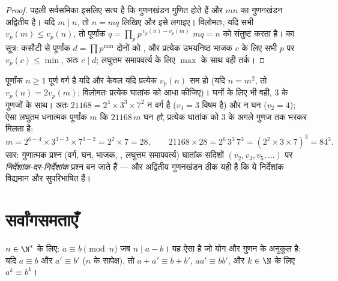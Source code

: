 \begin{proof}
पहली सर्वसमिका इसलिए सत्य है कि गुणनखंडन गुणित होते हैं और $mn$ का गुणनखंडन
अद्वितीय है। यदि $m \mid n$, तो $n = mq$ लिखिए और इसे लगाइए। विलोमतः, यदि
सभी $v_p(m) \leq v_p(n)$, तो पूर्णांक $q = \prod_p p^{\,v_p(n) - v_p(m)}$
$mq = n$ को संतुष्ट करता है।  का सूत्र: कसौटी से पूर्णांक $d
= \prod p^{\min}$ दोनों को , और प्रत्येक उभयनिष्ठ भाजक $c$ के
लिए सभी $p$ पर $v_p(c) \leq \min$, अतः $c \mid d$; लघुत्तम समापवर्त्य के लिए
$\max$ के साथ वही तर्क।
\end{proof}

\begin{example}[मूल्यांकनों से वर्ग और घन]\label{ex:b1:arith:squarecube}
पूर्णांक $n \geq 1$ पूर्ण वर्ग है यदि और केवल यदि प्रत्येक $v_p(n)$ सम हो
(यदि $n = m^2$, तो $v_p(n) = 2v_p(m)$; विलोमतः प्रत्येक घातांक को आधा
कीजिए)। घनों के लिए भी वही, $3$ के गुणजों के साथ। अतः $21168 = 2^4 \times
3^3 \times 7^2$ न वर्ग है ($v_3 = 3$ विषम है) और न घन ($v_2 = 4$); ऐसा लघुतम
धनात्मक पूर्णांक $m$ कि $21168\,m$ घन \emph{हो}, प्रत्येक घातांक को $3$ के
अगले गुणज तक भरकर मिलता है:
\[
m = 2^{6-4} \times 3^{3-3} \times 7^{3-2} = 2^2 \times 7 = 28,
\qquad
21168 \times 28 = 2^6\,3^3\,7^3 = (2^2 \times 3 \times 7)^3
= 84^3 .
\]
सार: गुणात्मक प्रश्न (वर्ग, घन, भाजक, , लघुत्तम समापवर्त्य)
घातांक सदिशों $(v_2, v_3, v_5, \dots)$ पर \emph{निर्देशांक-दर-निर्देशांक}
प्रश्न बन जाते हैं --- और अद्वितीय गुणनखंडन ठीक यही  है कि ये निर्देशांक
विद्यमान और सुपरिभाषित हैं।
\end{example}

\section{सर्वांगसमताएँ}

\begin{definition}\label{def:b1:arith:congruence}
$n \in \N^*$ के लिए: $a \equiv b \pmod n$ जब $n \mid a -
b$। यह ऐसा  है जो योग और गुणन के अनुकूल है: यदि $a \equiv b$ और
$a' \equiv b'$ ($n$ के सापेक्ष), तो $a + a' \equiv b + b'$, $aa' \equiv
bb'$, और $k \in \N$ के लिए $a^k \equiv b^k$।
\end{definition}

